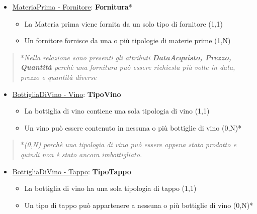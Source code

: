 \begin{itemize}
	\item \underline{MateriaPrima - Fornitore}: \textbf{Fornitura}*
	
	\begin{itemize}
		\item La Materia prima viene fornita da un solo tipo di fornitore (1,1)
		\item Un fornitore  fornisce da una o più tipologie di materie prime (1,N)
	\end{itemize}
	
\end{itemize}

\begin{verse}
*\emph{Nella relazione sono presenti gli attributi \textbf{DataAcquisto, Prezzo, Quantità} perchè una fornitura può essere richiesta più volte in data, prezzo e quantità diverse}
\end{verse}


\begin{itemize}
	\item \underline{BottigliaDiVino - Vino}: \textbf{TipoVino}
	
	\begin{itemize}
		\item La bottiglia di vino contiene una sola tipologia di vino (1,1)
		\item Un vino può essere contenuto in nessuna o più bottiglie di vino (0,N)*
	\end{itemize}
	
\end{itemize}

\begin{verse}
	*\emph{(0,N) perchè una tipologia di vino può essere appena stato prodotto e quindi non è stato ancora imbottigliato.}
\end{verse}

\begin{itemize}
	\item \underline{BottigliaDiVino - Tappo}: \textbf{TipoTappo}
	
	\begin{itemize}
		\item La bottiglia di vino ha una sola tipologia di tappo (1,1)
		\item Un tipo di tappo può appartenere a nessuna o più bottiglie di vino (0,N)*
	\end{itemize}
	
\end{itemize}

